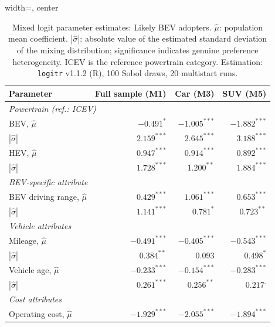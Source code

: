 \begin{table}[pos=H]
\caption{Mixed logit parameter estimates: Likely BEV adopters. $\hat{\mu}$: population mean coefficient. $|\hat{\sigma}|$: absolute value of the estimated standard deviation of the mixing distribution; significance indicates genuine preference heterogeneity. ICEV is the reference powertrain category. Estimation: \texttt{logitr} v1.1.2 (R), 100 Sobol draws, 20 multistart runs.}
\label{table:mxl_likely}
\begin{adjustbox}{width=\textwidth, center}
{\renewcommand{\arraystretch}{1.25}
\begin{tabular}{lrrr}
\toprule
\textbf{Parameter} & \textbf{Full sample (M1)} & \textbf{Car (M3)} & \textbf{SUV (M5)} \\
\midrule
\multicolumn{4}{l}{\textit{Powertrain (ref.: ICEV)}} \\[2pt]
\quad BEV, $\hat{\mu}$               & $-0.491^{*}$    & $-1.005^{***}$  & $-1.882^{***}$ \\
\quad\quad $|\hat{\sigma}|$          & $2.159^{***}$   & $2.645^{***}$   & $3.188^{***}$  \\[3pt]
\quad HEV, $\hat{\mu}$               & $\phantom{-}0.947^{***}$  & $\phantom{-}0.914^{***}$ & $\phantom{-}0.892^{***}$ \\
\quad\quad $|\hat{\sigma}|$          & $1.728^{***}$   & $1.200^{**}$    & $1.884^{***}$  \\[3pt]
\multicolumn{4}{l}{\textit{BEV-specific attribute}} \\[2pt]
\quad BEV driving range, $\hat{\mu}$ & $\phantom{-}0.429^{***}$  & $\phantom{-}1.061^{***}$ & $\phantom{-}0.653^{***}$ \\
\quad\quad $|\hat{\sigma}|$          & $1.141^{***}$   & $0.781^{*}$     & $0.723^{**}$   \\[3pt]
\multicolumn{4}{l}{\textit{Vehicle attributes}} \\[2pt]
\quad Mileage, $\hat{\mu}$           & $-0.491^{***}$  & $-0.405^{***}$  & $-0.543^{***}$ \\
\quad\quad $|\hat{\sigma}|$          & $0.384^{**}$    & $0.093$         & $0.498^{*}$    \\[3pt]
\quad Vehicle age, $\hat{\mu}$       & $-0.233^{***}$  & $-0.154^{***}$  & $-0.283^{***}$ \\
\quad\quad $|\hat{\sigma}|$          & $0.261^{***}$   & $0.256^{**}$    & $0.217^{.}$    \\[3pt]
\multicolumn{4}{l}{\textit{Cost attributes}} \\[2pt]
\quad Operating cost, $\hat{\mu}$    & $-1.929^{***}$  & $-2.055^{***}$  & $-1.894^{***}$ \\

\end{tabular}}
\end{adjustbox}
\end{table}
